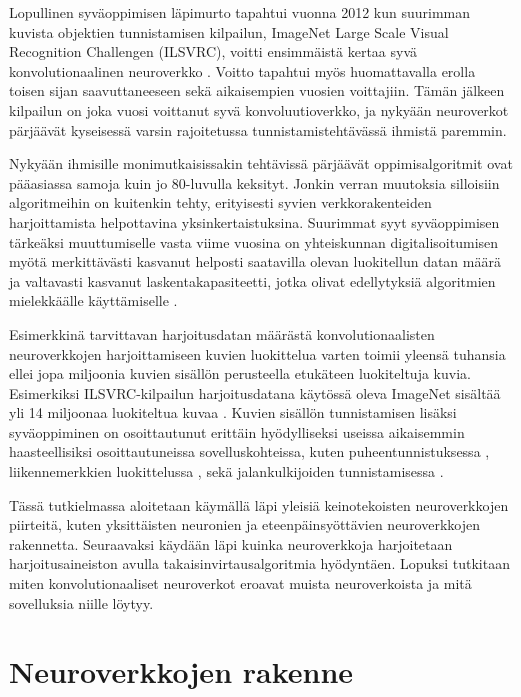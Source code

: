 \documentclass[finnish]{tktltiki2}
\theoremstyle{definition}
\theoremstyle{remark}
\begin{document}
  Lopullinen syväoppimisen läpimurto tapahtui vuonna 2012 kun suurimman kuvista objektien tunnistamisen kilpailun, ImageNet Large Scale Visual Recognition Challengen (ILSVRC), voitti ensimmäistä kertaa syvä konvolutionaalinen neuroverkko \cite{KSHimagenet2012}. Voitto tapahtui myös huomattavalla erolla toisen sijan saavuttaneeseen sekä aikaisempien vuosien voittajiin. Tämän jälkeen kilpailun on joka vuosi voittanut syvä konvoluutioverkko, ja nykyään neuroverkot pärjäävät kyseisessä varsin rajoitetussa tunnistamistehtävässä ihmistä paremmin.

  Nykyään ihmisille monimutkaisissakin tehtävissä pärjäävät oppimisalgoritmit ovat pääasiassa samoja kuin jo 80-luvulla keksityt. Jonkin verran muutoksia silloisiin algoritmeihin on kuitenkin tehty, erityisesti syvien verkkorakenteiden harjoittamista helpottavina yksinkertaistuksina. Suurimmat syyt syväoppimisen tärkeäksi muuttumiselle vasta viime vuosina on yhteiskunnan digitalisoitumisen myötä merkittävästi kasvanut helposti saatavilla olevan luokitellun datan määrä ja valtavasti kasvanut laskentakapasiteetti, jotka olivat edellytyksiä algoritmien mielekkäälle käyttämiselle \cite{Goodfellow-et-al-2016}.

  Esimerkkinä tarvittavan harjoitusdatan määrästä konvolutionaalisten neuroverkkojen harjoittamiseen kuvien luokittelua varten toimii yleensä tuhansia ellei jopa miljoonia kuvien sisällön perusteella etukäteen luokiteltuja kuvia. Esimerkiksi ILSVRC-kilpailun harjoitusdatana käytössä oleva ImageNet sisältää yli 14 miljoonaa luokiteltua kuvaa \cite{imagenet-website}. Kuvien sisällön tunnistamisen lisäksi syväoppiminen on osoittautunut erittäin hyödylliseksi useissa aikaisemmin haasteellisiksi osoittautuneissa sovelluskohteissa, kuten puheentunnistuksessa \cite{abdel2012applying}, liikennemerkkien luokittelussa \cite{sermanet2011traffic}, sekä jalankulkijoiden tunnistamisessa \cite{szarvas2005pedestrian}.

  Tässä tutkielmassa aloitetaan käymällä läpi yleisiä keinotekoisten neuroverkkojen piirteitä, kuten yksittäisten neuronien ja eteenpäinsyöttävien neuroverkkojen rakennetta. Seuraavaksi käydään läpi kuinka neuroverkkoja harjoitetaan harjoitusaineiston avulla takaisinvirtausalgoritmia hyödyntäen. Lopuksi tutkitaan miten konvolutionaaliset neuroverkot eroavat muista neuroverkoista ja mitä sovelluksia niille löytyy.

  \section{Neuroverkkojen rakenne}
\end{document}
